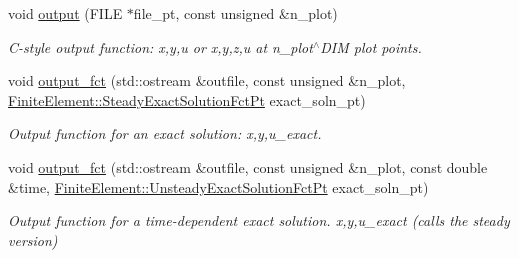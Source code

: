 \begin{DoxyCompactItemize}
void \hyperlink{classoomph_1_1THelmholtzElement_a156cee7b91f59f380139ce6551468b2c}{output} (F\+I\+LE $\ast$file\+\_\+pt, const unsigned \&n\+\_\+plot)
\begin{DoxyCompactList}\small\item\em C-\/style output function\+: x,y,u or x,y,z,u at n\+\_\+plot$^\wedge$\+D\+IM plot points. \end{DoxyCompactList}\item 
void \hyperlink{classoomph_1_1THelmholtzElement_a38d31ed7eae928a91af0bf96e57f366a}{output\+\_\+fct} (std\+::ostream \&outfile, const unsigned \&n\+\_\+plot, \hyperlink{classoomph_1_1FiniteElement_a690fd33af26cc3e84f39bba6d5a85202}{Finite\+Element\+::\+Steady\+Exact\+Solution\+Fct\+Pt} exact\+\_\+soln\+\_\+pt)
\begin{DoxyCompactList}\small\item\em Output function for an exact solution\+: x,y,u\+\_\+exact. \end{DoxyCompactList}\item 
void \hyperlink{classoomph_1_1THelmholtzElement_a043894a71e2508acf4a34b04469ec64e}{output\+\_\+fct} (std\+::ostream \&outfile, const unsigned \&n\+\_\+plot, const double \&time, \hyperlink{classoomph_1_1FiniteElement_ad4ecf2b61b158a4b4d351a60d23c633e}{Finite\+Element\+::\+Unsteady\+Exact\+Solution\+Fct\+Pt} exact\+\_\+soln\+\_\+pt)
\begin{DoxyCompactList}\small\item\em Output function for a time-\/dependent exact solution. x,y,u\+\_\+exact (calls the steady version) \end{DoxyCompactList}\end{DoxyCompactItemize}
